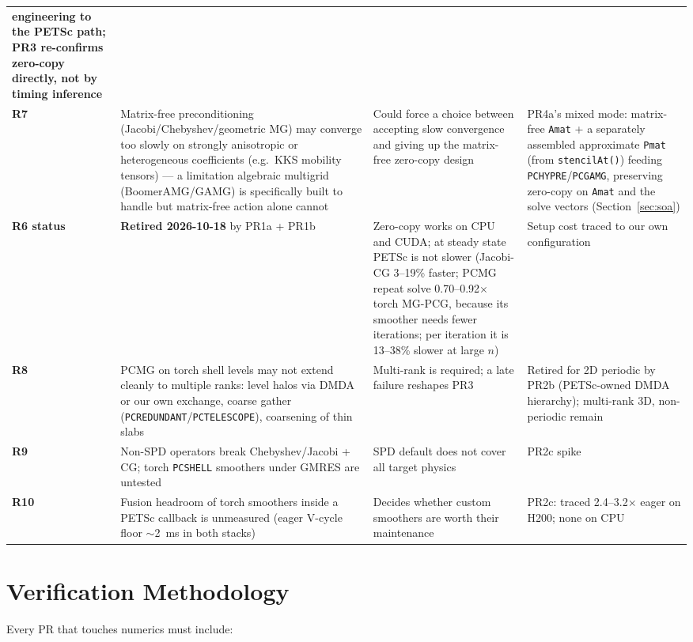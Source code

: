 \documentclass[11pt]{article}
\begin{document}
\begin{longtable}{>{\bfseries}p{} p{} p{} p{}}
engineering to the PETSc path; PR3 re-confirms zero-copy directly, not by
timing inference \\
R7 & Matrix-free preconditioning (Jacobi/Chebyshev/geometric MG) may
converge too slowly on strongly anisotropic or heterogeneous coefficients
(e.g.\ KKS mobility tensors) --- a limitation algebraic multigrid
(BoomerAMG/GAMG) is specifically built to handle but matrix-free action
alone cannot & Could force a choice between accepting slow convergence and
giving up the matrix-free zero-copy design & PR4a's mixed mode:
matrix-free \texttt{Amat} + a separately assembled approximate
\texttt{Pmat} (from \texttt{stencilAt()}) feeding
\texttt{PCHYPRE}/\texttt{PCGAMG}, preserving zero-copy on \texttt{Amat} and
the solve vectors (Section~\ref{sec:soa}) \\
R6 status & \textbf{Retired 2026-10-18} by PR1a + PR1b & Zero-copy works
on CPU and CUDA; at steady state PETSc is not slower (Jacobi-CG 3--19\%
faster; PCMG repeat solve 0.70--0.92$\times$ torch MG-PCG, because its smoother needs fewer iterations; per iteration it is 13--38\% slower at large $n$) & Setup cost
traced to our own configuration \\
R8 & PCMG on torch shell levels may not extend cleanly to multiple ranks:
level halos via DMDA or our own exchange, coarse gather
(\texttt{PCREDUNDANT}/\texttt{PCTELESCOPE}), coarsening of thin slabs &
Multi-rank is required; a late failure reshapes PR3 & Retired for 2D periodic by PR2b (PETSc-owned DMDA hierarchy); multi-rank 3D, non-periodic remain \\
R9 & Non-SPD operators break Chebyshev/Jacobi + CG; torch \texttt{PCSHELL}
smoothers under GMRES are untested & SPD default does not cover all target
physics & PR2c spike \\
R10 & Fusion headroom of torch smoothers inside a PETSc callback is
unmeasured (eager V-cycle floor $\sim$2~ms in both stacks) & Decides whether
custom smoothers are worth their maintenance & PR2c: traced 2.4--3.2$\times$
eager on H200; none on CPU \\
\bottomrule
\end{longtable}

\section{Verification Methodology}
\label{sec:verification}

Every PR that touches numerics must include:
\end{document}
